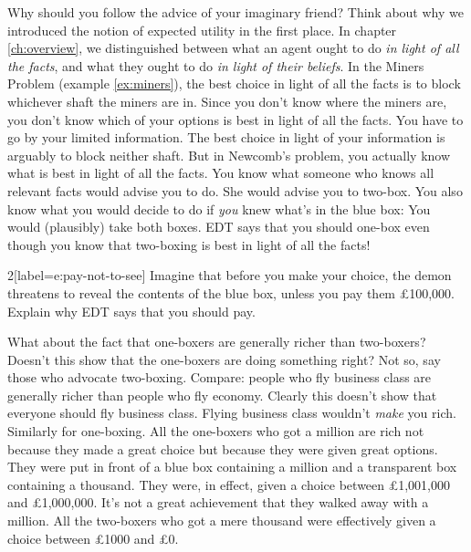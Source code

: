 Why should you follow the advice of your imaginary friend? Think about why we
introduced the notion of expected utility in the first place. In chapter
\ref{ch:overview}, we distinguished between what an agent ought to do \emph{in
  light of all the facts}, and what they ought to do \emph{in light of their
  beliefs}. In the Miners Problem (example \ref{ex:miners}), the best choice in
light of all the facts is to block whichever shaft the miners are in. Since you
don't know where the miners are, you don't know which of your options is best in
light of all the facts. You have to go by your limited information. The best
choice in light of your information is arguably to block neither shaft. But in
Newcomb's problem, you actually know what is best in light of all the facts. You
know what someone who knows all relevant facts would advise you to do. She would
advise you to two-box. You also know what you would decide to do if \emph{you}
knew what's in the blue box: You would (plausibly) take both boxes. EDT says
that you should one-box even though you know that two-boxing is best in light of
all the facts!

\begin{exercise}{2}[label=e:pay-not-to-see]
  Imagine that before you make your choice, the demon threatens to reveal the
  contents of the blue box, unless you pay them £100,000. Explain why EDT says
  that you should pay.
\end{exercise}

What about the fact that one-boxers are generally richer than two-boxers?
Doesn't this show that the one-boxers are doing something right? Not so, say
those who advocate two-boxing. Compare: people who fly business class are
generally richer than people who fly economy. Clearly this doesn't show that
everyone should fly business class. Flying business class wouldn't \emph{make}
you rich. Similarly for one-boxing. All the one-boxers who got a million are
rich not because they made a great choice but because they were given great
options. They were put in front of a blue box containing a million and a
transparent box containing a thousand. They were, in effect, given a choice
between £1,001,000 and £1,000,000. It's not a great achievement that they walked
away with a million. All the two-boxers who got a mere thousand were effectively
given a choice between £1000 and £0.


